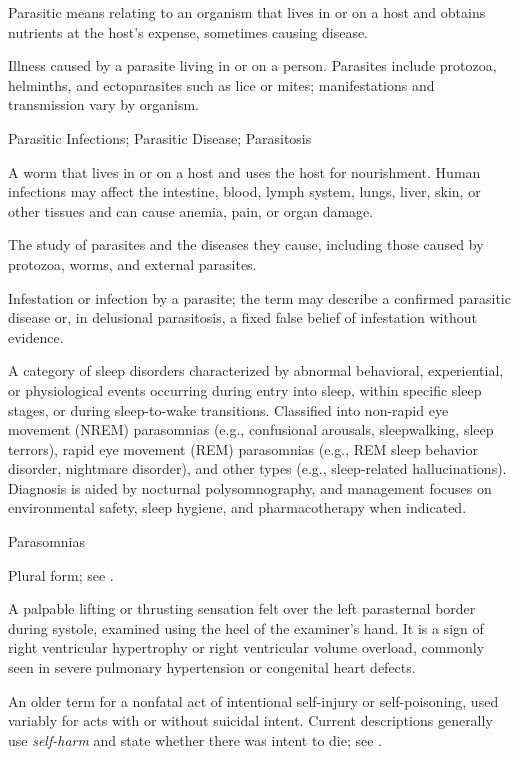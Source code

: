  Parasitic means relating to an organism that lives in or on a host and obtains nutrients at the host’s expense, sometimes causing disease.

 Illness caused by a parasite living in or on a person. Parasites include protozoa, helminths, and ectoparasites such as lice or mites; manifestations and transmission vary by organism.

\synonyms
Parasitic Infections; Parasitic Disease; Parasitosis

 A worm that lives in or on a host and uses the host for nourishment. Human infections may affect the intestine, blood, lymph system, lungs, liver, skin, or other tissues and can cause anemia, pain, or organ damage.

 The study of parasites and the diseases they cause, including those caused by protozoa, worms, and external parasites.

 Infestation or infection by a parasite; the term may describe a confirmed parasitic disease or, in delusional parasitosis, a fixed false belief of infestation without evidence.

 A category of sleep disorders characterized by abnormal behavioral, experiential, or physiological events occurring during entry into sleep, within specific sleep stages, or during sleep-to-wake transitions. Classified into non-rapid eye movement (NREM) parasomnias (e.g., confusional arousals, sleepwalking, sleep terrors), rapid eye movement (REM) parasomnias (e.g., REM sleep behavior disorder, nightmare disorder), and other types (e.g., sleep-related hallucinations). Diagnosis is aided by nocturnal polysomnography, and management focuses on environmental safety, sleep hygiene, and pharmacotherapy when indicated.

\synonyms
Parasomnias

 Plural form; see .

 A palpable lifting or thrusting sensation felt over the left parasternal border during systole, examined using the heel of the examiner's hand. It is a sign of right ventricular hypertrophy or right ventricular volume overload, commonly seen in severe pulmonary hypertension or congenital heart defects.

 An older term for a nonfatal act of intentional self-injury or self-poisoning, used variably for acts with or without suicidal intent. Current descriptions generally use \textit{self-harm} and state whether there was intent to die; see .

